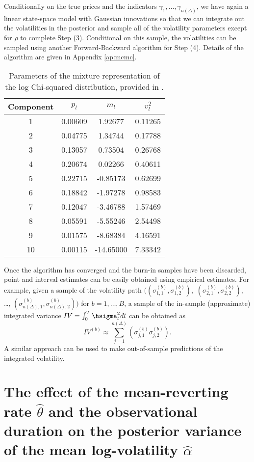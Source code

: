 Conditionally on the true prices and the indicators $\gamma_{1}, \ldots, \gamma_{n(\Delta)}$, we have again a linear state-space model with Gaussian innovations so that we can integrate out the volatilities in the posterior and sample all of the volatility parameters except for $\rho$ to complete Step (3). Conditional on this sample, the volatilities can be sampled using another Forward-Backward algorithm for Step (4). Details of the algorithm are given in Appendix \ref{ap:mcmc}.
\begin{table}
\begin{center}
\begin{tabular}{c|ccc}
Component   &   $p_l$   &   $m_l$   &   $v^2_l$  \\ \hline
1 & 0.00609 & 1.92677 & 0.11265 \\
2 & 0.04775 & 1.34744 & 0.17788 \\
3 & 0.13057 & 0.73504 & 0.26768 \\
4 & 0.20674 & 0.02266 & 0.40611 \\
5 & 0.22715 & -0.85173 & 0.62699 \\
6 & 0.18842 &-1.97278 & 0.98583 \\
7 & 0.12047 & -3.46788  & 1.57469 \\
8 & 0.05591 & -5.55246 & 2.54498 \\
9 & 0.01575 & -8.68384 & 4.16591 \\
10 & 0.00115 & -14.65000 & 7.33342
\end{tabular}
\caption{Parameters of the mixture representation of the log Chi-squared distribution, provided in \cite{omori2007stochastic}.}\label{ta:mixture_parameters}
\end{center}
\end{table}

Once the algorithm has converged and the burn-in samples have been discarded, point and interval estimates can be easily obtained using empirical estimates.  For example, given a sample of the volatility path $( (\sigma^{(b)}_{1,1},\sigma^{(b)}_{1,2}),$ $(\sigma^{(b)}_{2,1},\sigma^{(b)}_{2,2}),$ \ldots,  $(\sigma^{(b)}_{n(\Delta),1}, \sigma^{(b)}_{n(\Delta),2}))$ for $b=1, \ldots, B$, a sample of the in-sample (approximate) integrated variance $IV = \int_0^T \hsigma^2_t dt$ can be obtained as
$$
IV^{(b)} \approx \sum_{j=1}^{n(\Delta)} \left( \sigma^{(b)}_{j,1}\sigma^{(b)}_{j,2} \right)   .
$$
A similar approach can be used to make out-of-sample predictions of the integrated volatility.


\section{The effect of the mean-reverting rate $\hat{\theta}$ and the observational duration on the posterior variance of the mean log-volatility $\hat{\alpha}$}\label{effect-mean-reverting-rate}

